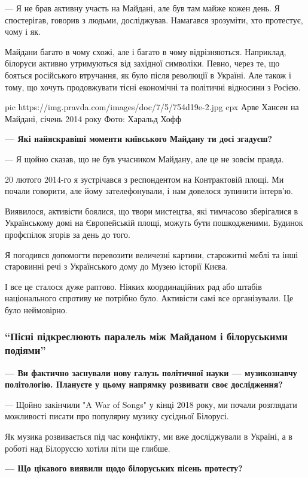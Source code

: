 — Я не брав активну участь на Майдані, але був там майже кожен день. Я
спостерігав, говорив з людьми, досліджував. Намагався зрозуміти, хто протестує,
чому і як.

Майдани багато в чому схожі, але і багато в чому відрізняються. Наприклад,
білоруси активно утримуються від західної символіки. Певно, через те, що
бояться російського втручання, як було після революції в Україні. Але також і
тому, що хочуть продовжувати тісні економічні та політичні відносини з Росією. 

\ifcmt
pic https://img.pravda.com/images/doc/7/5/754d19e-2.jpg
cpx Арве Хансен на Майдані, січень 2014 року Фото: Харальд Хофф
\fi

\textbf{— Які найяскравіші моменти київського Майдану ти досі згадуєш?}

— Я щойно сказав, що не був учасником Майдану, але це не зовсім правда.

20 лютого 2014-го я зустрічався з респондентом на Контрактовій площі. Ми почали
говорити, але йому зателефонували, і нам довелося зупинити інтерв’ю.

Виявилося, активісти боялися, що твори мистецтва, які тимчасово зберігалися в
Українському домі на Європейській площі, можуть бути пошкодженими. Будинок
профспілок згорів за день до того.

Я погодився допомогти перевозити величезні картини, старожитні меблі та інші
старовинні речі з Українського дому до Музею історії Києва.

І все це сталося дуже раптово. Ніяких координаційних рад або штабів
національного спротиву не потрібно було. Активісти самі все організували. Це
було неймовірно. 

\subsubsection{\enquote{Пісні підкреслюють паралель між Майданом і білоруськими подіями}}

\textbf{— Ви фактично заснували нову галузь політичної науки — музикознавчу
політологію. Плануєте у цьому напрямку розвивати своє дослідження?}

— Щойно закінчили "A War of Songs" у кінці 2018 року, ми почали розглядати
можливості писати про популярну музику сусідньої Білорусі.

Як музика розвивається під час конфлікту, ми вже досліджували в Україні, а в
роботі над Білоруссю хотіли піти ще глибше.

\textbf{— Що цікавого виявили щодо білоруських пісень протесту?} 

